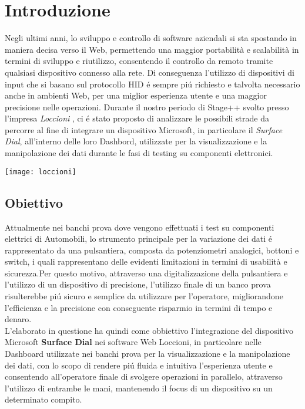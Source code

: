 \chapter{Introduzione}
\label{chap:intro}

Negli ultimi anni, lo sviluppo e controllo di software aziendali si sta spostando in maniera decisa verso il Web, permettendo una maggior portabilità e scalabilità in termini di sviluppo e riutilizzo, consentendo il controllo da remoto tramite qualsiasi dispositivo connesso alla rete. Di conseguenza l’utilizzo di dispositivi di input che si basano sul protocollo HID é sempre piú richiesto e talvolta necessario anche in ambienti Web, per una miglior esperienza utente e una maggior precisione nelle operazioni.
Durante il nostro periodo di Stage++ svolto presso l'impresa \emph{Loccioni} \cite{Loc}, ci é stato proposto di analizzare le possibili strade da percorre al fine di integrare un dispositivo Microsoft, in particolare il \emph{Surface Dial}\cite{dial}, all'interno delle loro Dashbord, utilizzate per la visualizzazione e la manipolazione dei dati durante le fasi di testing su componenti elettronici.
\begin{center}
\texttt{[image: loccioni]}
\end{center}

\newpage
\section{Obiettivo}
Attualmente nei banchi prova dove vengono effettuati i test su componenti elettrici di Automobili, lo strumento principale per la variazione dei dati é rappresentato da una pulsantiera, composta da potenziometri analogici, bottoni e switch, i quali rappresentano delle evidenti limitazioni in termini  di usabilità e sicurezza.Per questo motivo, attraverso una digitalizzazione della pulsantiera e l'utilizzo di un dispositivo di precisione, l'utilizzo finale di un banco prova risulterebbe piú sicuro e semplice da utilizzare per l'operatore, migliorandone l'efficienza e la precisione con conseguente risparmio in termini di tempo e denaro.\\

L'elaborato in questione ha quindi come obbiettivo l'integrazione del dispositivo Microsoft \textbf{Surface Dial} nei software Web Loccioni, in particolare nelle Dashboard utilizzate nei banchi prova per la visualizzazione e la manipolazione dei dati, con lo scopo di rendere piú fluida e intuitiva l'esperienza utente e consentendo all'operatore finale di svolgere operazioni in parallelo, attraverso l'utilizzo di entrambe le mani, mantenendo il focus di un dispositivo su un determinato compito.\\

